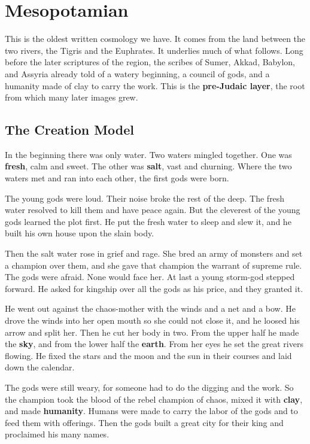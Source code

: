 \section{Mesopotamian}

This is the oldest written cosmology we have. It comes from the land between the two rivers, the Tigris and the Euphrates. It underlies much of what follows. Long before the later scriptures of the region, the scribes of Sumer, Akkad, Babylon, and Assyria already told of a watery beginning, a council of gods, and a humanity made of clay to carry the work. This is the \textbf{pre-Judaic layer}, the root from which many later images grew.

\subsection{The Creation Model}

In the beginning there was only water. Two waters mingled together. One was \textbf{fresh}, calm and sweet. The other was \textbf{salt}, vast and churning. Where the two waters met and ran into each other, the first gods were born.

The young gods were loud. Their noise broke the rest of the deep. The fresh water resolved to kill them and have peace again. But the cleverest of the young gods learned the plot first. He put the fresh water to sleep and slew it, and he built his own house upon the slain body.

Then the salt water rose in grief and rage. She bred an army of monsters and set a champion over them, and she gave that champion the warrant of supreme rule. The gods were afraid. None would face her. At last a young storm-god stepped forward. He asked for kingship over all the gods as his price, and they granted it.

He went out against the chaos-mother with the winds and a net and a bow. He drove the winds into her open mouth so she could not close it, and he loosed his arrow and split her. Then he cut her body in two. From the upper half he made the \textbf{sky}, and from the lower half the \textbf{earth}. From her eyes he set the great rivers flowing. He fixed the stars and the moon and the sun in their courses and laid down the calendar.

The gods were still weary, for someone had to do the digging and the work. So the champion took the blood of the rebel champion of chaos, mixed it with \textbf{clay}, and made \textbf{humanity}. Humans were made to carry the labor of the gods and to feed them with offerings. Then the gods built a great city for their king and proclaimed his many names.

